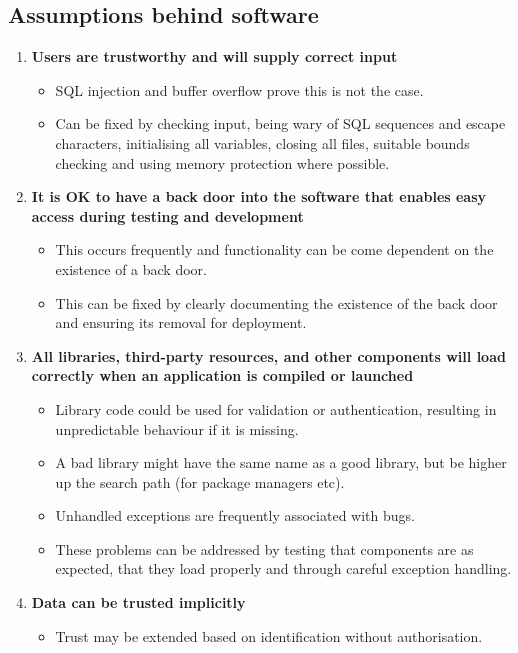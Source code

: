 \documentclass{article}
\begin{document}
\subsection{Assumptions behind software}
\begin{enumerate}
	\item \textbf{Users are trustworthy and will supply correct input}
	\begin{itemize}
		\item SQL injection and buffer overflow prove this is not the case.
		\item Can be fixed by checking input, being wary of SQL sequences and escape characters, initialising all variables, closing all files, suitable bounds checking and using memory protection where possible.
	\end{itemize}
	\item \textbf{It is OK to have a back door into the software that enables easy access during testing and development}
	\begin{itemize}
		\item This occurs frequently and functionality can be come dependent on the existence of a back door.
		\item This can be fixed by clearly documenting the existence of the back door and ensuring its removal for deployment.
	\end{itemize}
	\item \textbf{All libraries, third-party resources, and other components will load correctly when an application is compiled or launched}
	\begin{itemize}
		\item Library code could be used for validation or authentication, resulting in unpredictable behaviour if it is missing.
		\item A bad library might have the same name as a good library, but be higher up the search path (for package managers etc).
		\item Unhandled exceptions are frequently associated with bugs.
		\item These problems can be addressed by testing that components are as expected, that they load properly and through careful exception handling.
	\end{itemize}
	\pagebreak
	\item \textbf{Data can be trusted implicitly}
	\begin{itemize}
		\item Trust may be extended based on identification without authorisation.

\end{itemize}
\end{enumerate}
\end{document}

